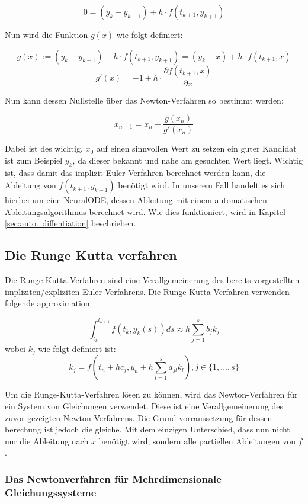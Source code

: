 $$
0 = (y_k - y_{k + 1})  + h \cdot f(t_{k + 1}, y_{k + 1})
$$

Nun wird die Funktion $g(x)$ wie folgt definiert:

$$
g(x) := (y_k - y_{k + 1})  + h \cdot f(t_{k + 1}, y_{k + 1}) = (y_k - x)  + h \cdot f(t_{k + 1}, x)
$$
$$
g'(x) = -1 + h \cdot \frac{\partial f(t_{k+1}, x)}{\partial x}
$$

Nun kann dessen Nullstelle über das Newton-Verfahren so bestimmt werden:

$$
x_{n+1} = x_{n} - \frac{g(x_n)}{g'(x_n)}
$$

Dabei ist des wichtig, $x_{0}$ auf einen sinnvollen Wert zu setzen ein guter Kandidat ist zum Beispiel
$y_{k}$, da dieser bekannt und nahe am gesuchten Wert liegt.
Wichtig ist, dass damit das implizit Euler-Verfahren berechnet werden kann, die Ableitung von $f(t_{k + 1}, y_{k + 1})$ benötigt wird.
In unserem Fall handelt es sich hierbei um eine NeuralODE, dessen Ableitung mit einem automatischen Ableitungsalgorithmus berechnet wird. 
Wie dies funktioniert, wird in Kapitel \ref{sec:auto_diffentiation} beschrieben.

\subsection{Die Runge Kutta verfahren} \label{sec:runge_kutta}

Die Runge-Kutta-Verfahren \cite[Kapitel~II.1]{ode1} sind eine Verallgemeinerung des
bereits vorgestellten impliziten/expliziten Euler-Verfahrens.
Die Runge-Kutta-Verfahren verwenden folgende approximation:

$$
\int_{t_k}^{t_{k+1}} f(t_k, y_k(s)) ds \approx h \sum_{j=1}^{s} b_j k_j
$$
wobei $k_j$ wie folgt definiert ist:
$$
k_j = f(t_n + h c_j, y_n + h \sum_{l=1}^{s}a_{jl}k_{l}) , j \in \{1, ..., s\}
$$


Um die Runge-Kutta-Verfahren lösen zu können, wird das Newton-Verfahren für ein 
System von Gleichungen verwendet.
Diese ist eine Verallgemeinerung des zuvor gezeigten Newton-Verfahrens.
Die Grund vorraussetzung für dessen berechung ist jedoch die gleiche.
Mit dem einzigen Unterschied, dass nun nicht nur die Ableitung nach $x$ benötigt wird, sondern alle partiellen Ableitungen von $f$.

\subsubsection{Das Newtonverfahren für Mehrdimensionale Gleichungssysteme}

